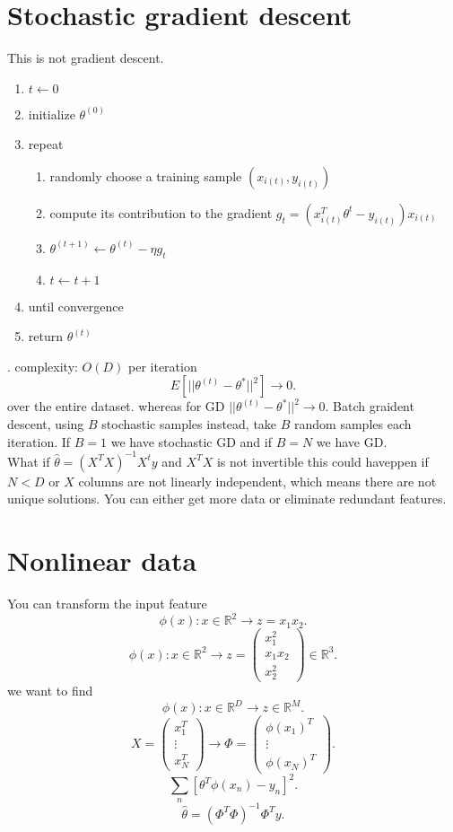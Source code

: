 \documentclass[a4paper,12pt]{scrartcl} %
\theoremstyle{darktheorem}
\begin{document}
\section{Stochastic gradient descent}
This is not gradient descent.
\begin{enumerate}
    \item $t \leftarrow 0$ 
    \item initialize $\theta^{(0)}$ 
    \item repeat
        \begin{enumerate}
            \item randomly choose a training sample $(x_{i(t)},y_{i(t)})$
            \item compute its contribution to the gradient  $g_t = (x_{i(t)}^{T}\theta^{t}-  y_{i(t)})x_{i(t)}$\\
            \item $\theta^{(t+1)} \leftarrow \theta^{(t)} - \eta g_t$ 
            \item $t \leftarrow t + 1$
        \end{enumerate}
    \item until convergence
    \item return $\theta^{(t)}$
\end{enumerate}.
complexity: $O(D)$ per iteration
\[
    E[||\theta^{(t)}-\theta^{*}||^2] \rightarrow 0
.\] 
over the entire dataset.
whereas for GD $||\theta^{(t)}-\theta^{*}||^2 \rightarrow 0$.
Batch graident descent, using $B$ stochastic samples instead, take $B$ random samples each iteration. If $B=1$ we have stochastic GD and if $B = N $ we have GD.\\
What if $\hat \theta = (X^{T}X)^{-1}X^{t}y$ and $X^{T}X$ is not invertible this could haveppen if $N < D$ or $X$ columns are not linearly independent, which means there are not unique solutions.
You can either get more data or eliminate redundant features.


\section{Nonlinear data}
You can transform the input feature
\[
\phi(x): x \in \mathbb{R}^2 \rightarrow z = x_1 x_2
.\] 
\[
\phi(x): x \in \mathbb{R}^2 \rightarrow z = \begin{pmatrix}  x_1^2 \\ x_1 x_2 \\ x_2^2 \end{pmatrix}  \in \mathbb{R}^{3}
.\] 
we want to find
\[
\phi(x): x \in \mathbb{R}^{D} \rightarrow z \in \mathbb{R}^{M}
.\] 
\[
X = \begin{pmatrix} x_1^{T} \\ \vdots \\ x_N^{T} \end{pmatrix}  \rightarrow \Phi = \begin{pmatrix} \phi(x_1)^{T} \\ \vdots \\ \phi(x_N)^{T} \end{pmatrix} 
.\] 
\[
    \sum_{n}^{}[\theta^{T}\phi(x_n) - y_n]^2
.\] 
\[
\hat \theta = (\Phi^{T}\Phi)^{-1}\Phi^{T}y
.\] 
\end{document}
